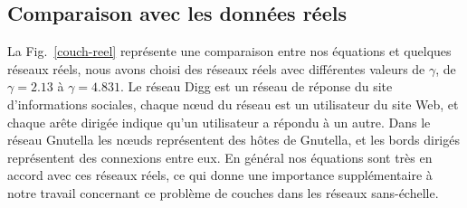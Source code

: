 \subsection{Comparaison avec les données réels}
La Fig.~\ref{couch-reel} représente une comparaison entre nos équations et quelques réseaux réels, nous avons choisi des réseaux réels avec différentes valeurs de $\gamma$, de $\gamma=2.13$ à $\gamma=4.831$.
Le réseau Digg est un réseau de réponse du site d'informations sociales, chaque nœud du réseau est un utilisateur du site Web, et chaque arête dirigée indique qu'un utilisateur a répondu à un autre. Dans le réseau Gnutella les nœuds représentent des hôtes de Gnutella, et les bords dirigés représentent des connexions entre eux. En général nos équations sont très en accord avec ces réseaux réels, ce qui donne une importance supplémentaire à notre travail concernant ce problème de couches dans les réseaux sans-échelle. 


